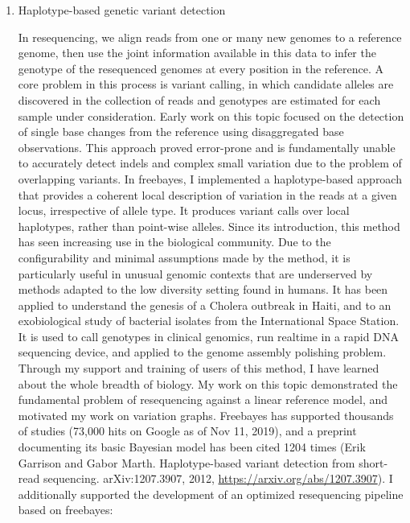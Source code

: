 \documentclass{nihbiosketch}
\begin{document}
\begin{enumerate}

\item Haplotype-based genetic variant detection
  
In resequencing, we align reads from one or many new genomes to a reference genome, then use the joint information available in this data to infer the genotype of the resequenced genomes at every position in the reference. A core problem in this process is variant calling, in which candidate alleles are discovered in the collection of reads and genotypes are estimated for each sample under consideration. Early work on this topic focused on the detection of single base changes from the reference using disaggregated base observations. This approach proved error-prone and is fundamentally unable to accurately detect indels and complex small variation due to the problem of overlapping variants. In freebayes, I implemented a haplotype-based approach that provides a coherent local description of variation in the reads at a given locus, irrespective of allele type. It produces variant calls over local haplotypes, rather than point-wise alleles. Since its introduction, this method has seen increasing use in the biological community. Due to the configurability and minimal assumptions made by the method, it is particularly useful in unusual genomic contexts that are underserved by methods adapted to the low diversity setting found in humans. It has been applied to understand the genesis of a Cholera outbreak in Haiti, and to an exobiological study of bacterial isolates from the International Space Station. It is used to call genotypes in clinical genomics, run realtime in a rapid DNA sequencing device, and applied to the genome assembly polishing problem. Through my support and training of users of this method, I have learned about the whole breadth of biology. My work on this topic demonstrated the fundamental problem of resequencing against a linear reference model, and motivated my work on variation graphs. Freebayes has supported thousands of studies (73,000 hits on Google as of Nov 11, 2019), and a preprint documenting its basic Bayesian model has been cited 1204 times (Erik Garrison and Gabor Marth. Haplotype-based variant detection from short-read sequencing. arXiv:1207.3907, 2012, \url{https://arxiv.org/abs/1207.3907}). I additionally supported the development of an optimized resequencing pipeline based on freebayes:

  \begin{enumerate} %


\end{enumerate}
\end{enumerate}
\end{document}
